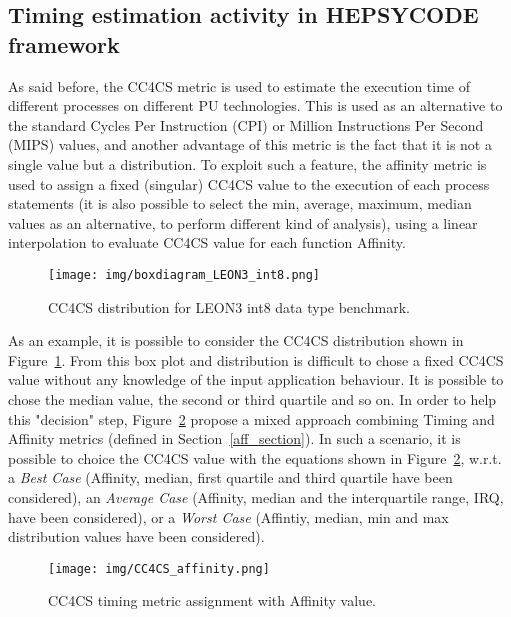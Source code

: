 \subsection{Timing estimation activity in HEPSYCODE framework}\label{exploit_CC4CS_01}
%
As said before, the CC4CS metric is used to estimate the execution time of different processes on different PU technologies. This is used as an alternative to the standard Cycles Per Instruction (CPI) or Million Instructions Per Second (MIPS) values, and another advantage of this metric is the fact that it is not a single value but a distribution. To exploit such a feature, the affinity metric is used to assign a fixed (singular) CC4CS value to the execution of each process statements (it is also possible to select the min, average, maximum, median values as an alternative, to perform different kind of analysis), using a linear interpolation to evaluate CC4CS value for each function Affinity. \par
%
\begin{figure}[htbp!]
	\centerline{\texttt{[image: img/boxdiagram\_LEON3\_int8.png]}}
	\caption{CC4CS distribution for LEON3 int8 data type benchmark.}
	\label{boxplot_cc4cs_show}
\end{figure} 
%
As an example, it is possible to consider the CC4CS distribution shown in Figure~\ref{boxplot_cc4cs_show}. From this box plot and distribution is difficult to chose a fixed CC4CS value without any knowledge of the input application behaviour. It is possible to chose the median value, the second or third quartile and so on. In order to help this "decision" step, Figure~\ref{boxplot_cc4cs_show_solution} propose a mixed approach combining Timing and Affinity metrics (defined in Section~\ref{aff_section}). In such a scenario, it is possible to choice the CC4CS value with the equations shown in Figure~\ref{boxplot_cc4cs_show_solution}, w.r.t. a \textit{Best Case} (Affinity, median, first quartile and third quartile have been considered), an \textit{Average Case} (Affinity, median and the interquartile range, IRQ, have been considered), or a \textit{Worst Case} (Affintiy, median, min and max distribution values have been considered).
%
\begin{figure}[htbp!]
	\centerline{\texttt{[image: img/CC4CS\_affinity.png]}}
	\caption{CC4CS timing metric assignment with Affinity value.}
	\label{boxplot_cc4cs_show_solution}
\end{figure} 
%
\begin{comment}
%
\section{Bandwidth}
%
The bandwidth estimation considers each communication operation, evaluating the size of exchanged data in the following equation:
%
\begin{equation} \label{eq20_ch_bandwidth}
\resizebox{0.6 \textwidth}{!}{$%
\begin{aligned} 
    BW = (\# data \ exchanged \ \ [bits]) * (link \ speed \ \ [bits/s])
\end{aligned}
$%
}
\end{equation}
%
\end{comment}
%
